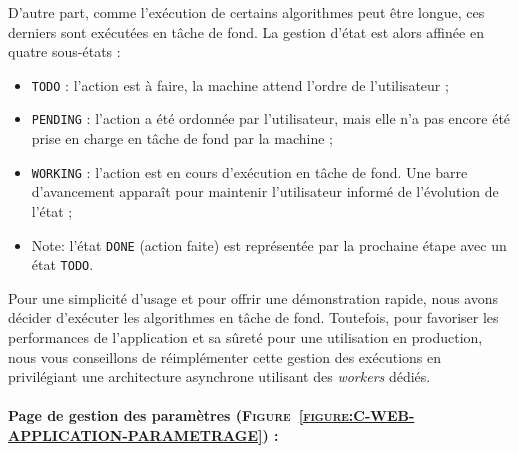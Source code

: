 		D'autre part, comme l'exécution de certains algorithmes peut être longue, ces derniers sont exécutées en tâche de fond.
		La gestion d'état est alors affinée en quatre sous-états :
		\begin{itemize}
			\item \texttt{TODO} : l'action est à faire, la machine attend l'ordre de l'utilisateur ;
			\item \texttt{PENDING} : l'action a été ordonnée par l'utilisateur, mais elle n'a pas encore été prise en charge en tâche de fond par la machine ;
			\item \texttt{WORKING} : l'action est en cours d'exécution en tâche de fond. Une barre d'avancement apparaît pour maintenir l'utilisateur informé de l'évolution de l'état ;
			\item Note: l'état \texttt{DONE} (action faite) est représentée par la prochaine étape avec un état \texttt{TODO}.
		\end{itemize}
		
		\begin{leftBarAuthorOpinion}
			Pour une simplicité d'usage et pour offrir une démonstration rapide, nous avons décider d'exécuter les algorithmes en tâche de fond.
			Toutefois, pour favoriser les performances de l'application et sa sûreté pour une utilisation en production, nous vous conseillons de réimplémenter cette gestion des exécutions en privilégiant une architecture asynchrone utilisant des \textit{workers} dédiés.
		\end{leftBarAuthorOpinion}
	
	
	\newpage
	\paragraph{Page de gestion des paramètres (\textsc{Figure~\ref{figure:C-WEB-APPLICATION-PARAMETRAGE}}) :}
	
